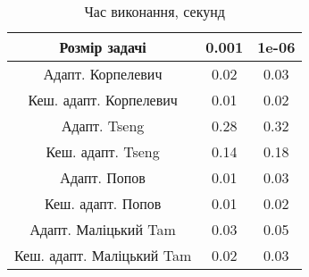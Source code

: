 \begin{table}[H]
	\centering
	\begin{tabular}{|c||c|c|}\hline
		Розмір задачі & 0.001 & 1e-06 \\ \hline \hline
		Адапт. Корпелевич & 0.02 & 0.03 \\ \hline
		Кеш. адапт. Корпелевич & 0.01 & 0.02 \\ \hline
		Адапт. Tseng & 0.28 & 0.32 \\ \hline
		Кеш. адапт. Tseng & 0.14 & 0.18 \\ \hline
		Адапт. Попов & 0.01 & 0.03 \\ \hline
		Кеш. адапт. Попов & 0.01 & 0.02 \\ \hline
		Адапт. Маліцький Tam & 0.03 & 0.05 \\ \hline
		Кеш. адапт. Маліцький Tam & 0.02 & 0.03 \\ \hline
	\end{tabular}
	\caption{Час виконання, секунд}
\end{table}
